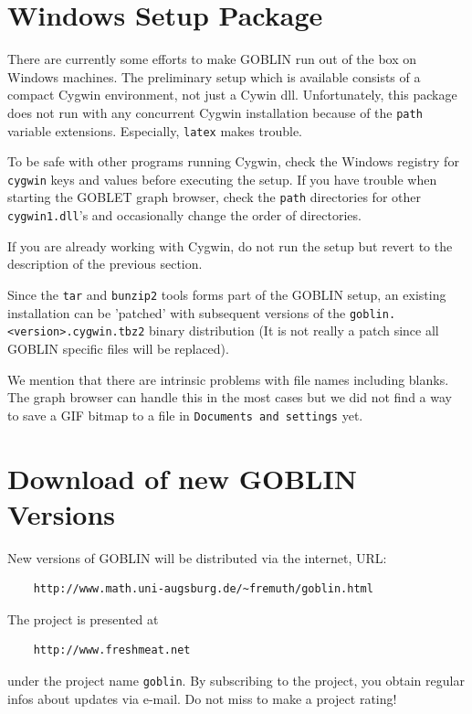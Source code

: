 \documentclass[a4paper,11pt,twoside]{book}
\begin{document}
\begin{multicols}{2}
\section{Windows Setup Package}

There are currently some efforts to make GOBLIN run out of the box on Windows
machines. The preliminary setup which is available consists of a compact
Cygwin environment, not just a Cywin dll. Unfortunately, this package does not
run with any concurrent Cygwin installation because of the \verb/path/ variable
extensions. Especially, \verb/latex/ makes trouble.

To be safe with other programs running Cygwin, check the Windows registry for
\verb/cygwin/ keys and values before executing the setup. If you have trouble
when starting the GOBLET graph browser, check the \verb/path/ directories for
other \verb/cygwin1.dll/'s and occasionally change the order of directories.

If you are already working with Cygwin, do not run the setup but revert to the
description of the previous section.

Since the \verb/tar/ and \verb/bunzip2/ tools forms part of the GOBLIN setup,
an existing installation can be 'patched' with subsequent versions of the
\verb/goblin.<version>.cygwin.tbz2/ binary distribution (It is not really a
patch since all GOBLIN specific files will be replaced).

We mention that there are intrinsic problems with file names including blanks.
The graph browser can handle this in the most cases but we did not find a way
to save a GIF bitmap to a file in \verb/Documents and settings/ yet.



\section{Download of new GOBLIN Versions}

New versions of GOBLIN will be distributed via the internet, URL:
\begin{verbatim}
    http://www.math.uni-augsburg.de/~fremuth/goblin.html
\end{verbatim}
The project is presented at
\begin{verbatim}
    http://www.freshmeat.net
\end{verbatim}
under the project name \verb/goblin/. By subscribing to the project, you
obtain regular infos about updates via e-mail. Do not miss to make a project
rating!



\end{multicols}
\end{document}
